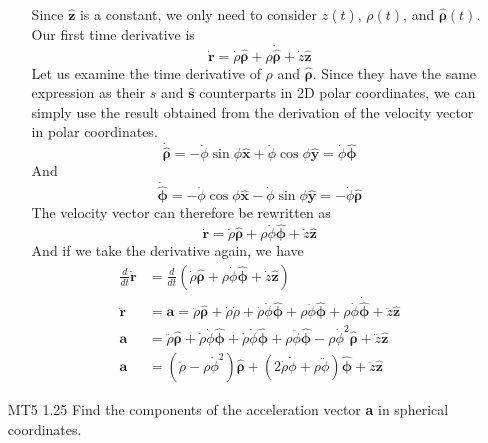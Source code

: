 \documentclass[12pt]{article}
\newcommand{\dydx}[2]{\frac{d #1}{d #2}}
\newcommand{\paren}[1]{\left( #1 \right)}
\newcommand{\unx}{\hat{\mathbf{x}}}
\newcommand{\uny}{\hat{\mathbf{y}}}
\newcommand{\unz}{\hat{\mathbf{z}}}
\newcommand{\uns}{\hat{\mathbf{s}}}
\newcommand{\unphi}{\hat{\boldsymbol\phi}}
\newcommand{\unrho}{\hat{\boldsymbol\rho}}
\begin{document}
\begin{enumerate}
\begin{itemize}
            Since $\unz$ is a constant, we only need to consider $z(t)$, $\rho(t)$, and $\unrho(t)$. Our first time derivative is
            \[
            \dot{\mathbf{r}} = \dot{\rho}\unrho + \rho\dot{\unrho} + \dot{z}\unz
            \]
            Let us examine the time derivative of $\rho$ and $\unrho$. Since they have the same expression as their $s$ and $\uns$ counterparts in 2D polar coordinates, we can simply use the result obtained from the derivation of the velocity vector in polar coordinates.
            \[
            \dot{\unrho} = -\Dot{\phi}\sin\phi\unx + \Dot{\phi}\cos\phi\uny = \Dot{\phi}\unphi
            \]
            And 
            \[
            \Dot{\unphi} = -\Dot{\phi}\cos\phi\unx - \Dot{\phi}\sin\phi\uny = - \Dot{\phi}\unrho
            \]
            The velocity vector can therefore be rewritten as
            \[
            \dot{\mathbf{r}} = \dot{\rho}\unrho + \rho\dot{\phi}\unphi + \dot{z}\unz
            \]
            And if we take the derivative again, we have
            \begin{align*}
                \dydx{}{t}\Dot{\mathbf{r}} &= \dydx{}{t}\paren{\Dot{\rho}\unrho + \rho\Dot{\phi}\unphi+\dot{z}\unz} \\
                \ddot{\mathbf{r}} &= \textbf{a} = \ddot{\rho}\unrho + \dot{\rho}\dot{\rho} + \dot{\rho}\Dot{\phi}\unphi + \rho\ddot{\phi}\unphi + \rho\dot{\phi}\dot{\unphi}+\ddot{z}\unz\\
                  \textbf{a}&= \ddot{\rho}\unrho + \dot{\rho}\dot{\phi}\unphi + \dot{\rho}\dot{\phi}\unphi + \rho\ddot{\phi}\unphi -  \rho\dot{\phi}^2\unrho+\ddot{z}\unz\\
                  \textbf{a}&= \paren{\ddot{\rho}-\rho\dot{\phi}^2}\unrho + \paren{2\dot{\rho}\dot{\phi}+\rho\ddot{\phi}}\unphi+\ddot{z}\unz
            \end{align*}


            
        \end{itemize}

    \newpage
    \item[MT5 1.25] Find the components of the acceleration vector \textbf{a} in spherical coordinates.



\end{enumerate}
\end{document}
